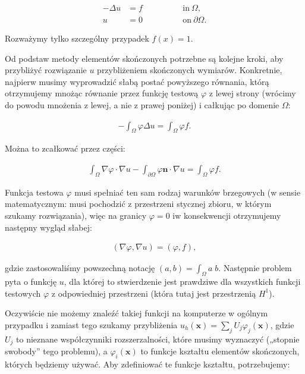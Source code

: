 \documentclass[]{pracamgr}
\begin{document}
      \begin{align*}
        -\Delta u &= f \qquad\qquad & \text{in}\ \Omega,
        \\
        u &= 0 \qquad\qquad & \text{on}\ \partial\Omega.
      \end{align*}
      
      Rozważymy tylko szczególny przypadek $f(x)=1$.

      Od podstaw metody elementów skończonych potrzebne są kolejne kroki, aby przybliżyć rozwiązanie $u$ przybliżeniem skończonych wymiarów. Konkretnie, najpierw musimy wyprowadzić słabą postać powyższego równania, którą otrzymujemy mnożąc równanie przez funkcję testową $\varphi$ z lewej strony (wrócimy do powodu mnożenia z lewej, a nie z prawej poniżej) i całkując po domenie $\Omega$:
      
      \begin{align*}
        -\int_\Omega \varphi \Delta u = \int_\Omega \varphi f.
      \end{align*}
      
      Można to zcałkować przez części:
      
      \begin{align*}
        \int_\Omega \nabla\varphi \cdot \nabla u
        -
        \int_{\partial\Omega} \varphi \mathbf{n}\cdot \nabla u
         = \int_\Omega \varphi f.
      \end{align*}
      
      Funkcja testowa $\varphi$ musi spełniać ten sam rodzaj warunków brzegowych (w sensie matematycznym: musi pochodzić z przestrzeni stycznej zbioru, w którym szukamy rozwiązania), więc na granicy $\varphi=0$ iw konsekwencji otrzymujemy następny wygląd słabej:
      
      \begin{align*}
        (\nabla\varphi, \nabla u)
         = (\varphi, f),
      \end{align*}

      gdzie zastosowaliśmy powszechną notację $(a,b)=\int_\Omega a\; b$. Następnie problem pyta o funkcję $u$, dla której to stwierdzenie jest prawdziwe dla wszystkich funkcji testowych $\varphi$ z odpowiedniej przestrzeni (która tutaj jest przestrzenią $H^1$).

      Oczywiście nie możemy znaleźć takiej funkcji na komputerze w ogólnym przypadku i zamiast tego szukamy przybliżenia $u_h(\mathbf x)=\sum_j U_j \varphi_j(\mathbf x)$, gdzie $U_j$ to nieznane współczynniki rozszerzalności, które musimy wyznaczyć („stopnie swobody” tego problemu), a $\varphi_i(\mathbf x)$ to funkcje kształtu elementów skończonych, których będziemy używać. Aby zdefiniować te funkcje kształtu, potrzebujemy:
      
\end{document}
